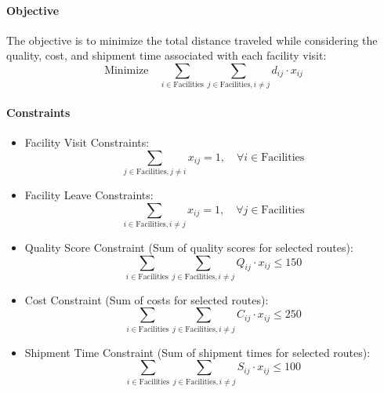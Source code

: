 \paragraph{Objective}
The objective is to minimize the total distance traveled while considering the quality, cost, and shipment time associated with each facility visit:
\begin{equation}
\text{Minimize} \quad \sum_{i \in \text{Facilities}} \sum_{j \in \text{Facilities}, i \neq j} d_{ij} \cdot x_{ij}
\end{equation}

\paragraph{Constraints}
\begin{itemize}
    \item Facility Visit Constraints:
    \begin{equation}
    \sum_{j \in \text{Facilities}, j \neq i} x_{ij} = 1, \quad \forall i \in \text{Facilities}
    \end{equation}
    
    \item Facility Leave Constraints:
    \begin{equation}
    \sum_{i \in \text{Facilities}, i \neq j} x_{ij} = 1, \quad \forall j \in \text{Facilities}
    \end{equation}
    
    \item Quality Score Constraint (Sum of quality scores for selected routes):
    \begin{equation}
    \sum_{i \in \text{Facilities}} \sum_{j \in \text{Facilities}, i \neq j} Q_{ij} \cdot x_{ij} \leq 150
    \end{equation}
    
    \item Cost Constraint (Sum of costs for selected routes):
    \begin{equation}
    \sum_{i \in \text{Facilities}} \sum_{j \in \text{Facilities}, i \neq j} C_{ij} \cdot x_{ij} \leq 250
    \end{equation}
    
    \item Shipment Time Constraint (Sum of shipment times for selected routes):
    \begin{equation}
    \sum_{i \in \text{Facilities}} \sum_{j \in \text{Facilities}, i \neq j} S_{ij} \cdot x_{ij} \leq 100
    \end{equation}
\end{itemize}

